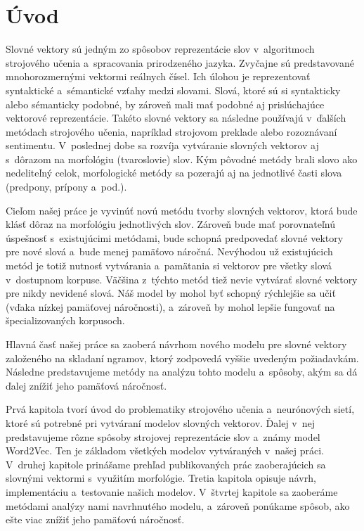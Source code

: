 \chapter*{Úvod}

Slovné vektory sú jedným zo spôsobov reprezentácie slov v~algoritmoch strojového učenia a~spracovania prirodzeného jazyka. Zvyčajne sú predstavované mnohorozmernými vektormi reálnych čísel. Ich úlohou je reprezentovať syntaktické a~sémantické vzťahy medzi slovami. Slová, ktoré sú si syntakticky alebo sémanticky podobné, by zároveň mali mať podobné aj prislúchajúce vektorové reprezentácie. Takéto slovné vektory sa následne používajú v~ďalších metódach strojového učenia, napríklad strojovom preklade alebo rozoznávaní sentimentu. V~poslednej dobe sa rozvíja vytváranie slovných vektorov aj s~dôrazom na morfológiu (tvaroslovie) slov. Kým pôvodné metódy brali slovo ako nedeliteľný celok, morfologické metódy sa pozerajú aj na jednotlivé časti slova (predpony, prípony a~pod.). 

Cieľom našej práce je vyvinúť novú metódu tvorby slovných vektorov, ktorá bude klásť dôraz na morfológiu jednotlivých slov. Zároveň bude mať porovnateľnú úspešnosť s~existujúcimi metódami, bude schopná predpovedať slovné vektory pre nové slová a~bude menej pamäťovo náročná. Nevýhodou už existujúcich metód je totiž nutnosť vytvárania a~pamätania si vektorov pre všetky slová v~dostupnom korpuse. Väčšina z~týchto metód tiež nevie vytvárať slovné vektory pre nikdy nevidené slová. Náš model by mohol byť schopný rýchlejšie sa učiť (vďaka nízkej pamäťovej náročnosti), a~zároveň by mohol lepšie fungovať na špecializovaných korpusoch. 

Hlavná časť našej práce sa zaoberá návrhom nového modelu pre slovné vektory založeného na skladaní ngramov, ktorý zodpovedá vyššie uvedeným požiadavkám. Následne predstavujeme metódy na analýzu tohto modelu a~spôsoby, akým sa dá ďalej znížiť jeho pamäťová náročnosť. 

Prvá kapitola tvorí úvod do problematiky strojového učenia a~neurónových sietí, ktoré sú potrebné pri vytváraní modelov slovných vektorov. Ďalej v~nej predstavujeme rôzne spôsoby strojovej reprezentácie slov a~známy model Word2Vec. Ten je základom všetkých modelov vytváraných v~našej práci. V~druhej kapitole prinášame prehľad publikovaných prác zaoberajúcich sa slovnými vektormi s~využitím morfológie. Tretia kapitola opisuje návrh, implementáciu a~testovanie našich modelov. V~štvrtej kapitole sa zaoberáme metódami analýzy nami navrhnutého modelu, a~zároveň ponúkame spôsob, ako ešte viac znížiť jeho pamäťovú náročnosť. 
